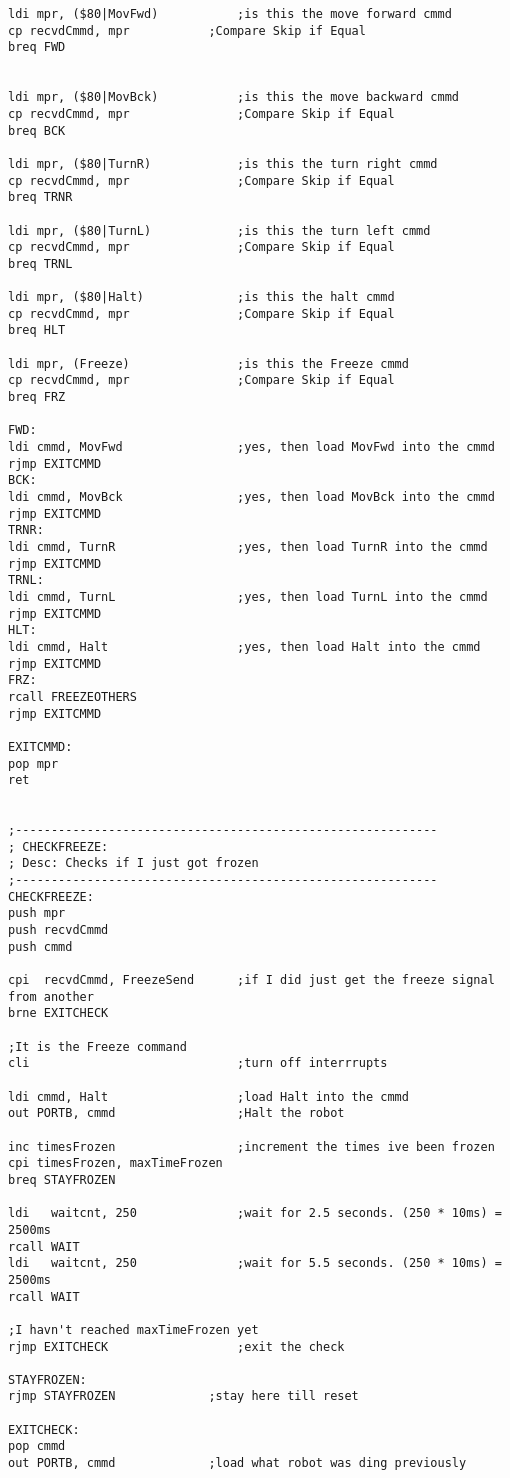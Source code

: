 \documentclass[12pt,letterpaper]{article}
\begin{document}
\begin{verbatim}
ldi mpr, ($80|MovFwd)			;is this the move forward cmmd
cp recvdCmmd, mpr 			;Compare Skip if Equal
breq FWD


ldi mpr, ($80|MovBck)			;is this the move backward cmmd
cp recvdCmmd, mpr				;Compare Skip if Equal
breq BCK

ldi mpr, ($80|TurnR)			;is this the turn right cmmd
cp recvdCmmd, mpr				;Compare Skip if Equal
breq TRNR

ldi mpr, ($80|TurnL)			;is this the turn left cmmd
cp recvdCmmd, mpr				;Compare Skip if Equal
breq TRNL

ldi mpr, ($80|Halt)				;is this the halt cmmd
cp recvdCmmd, mpr				;Compare Skip if Equal
breq HLT

ldi mpr, (Freeze)				;is this the Freeze cmmd
cp recvdCmmd, mpr				;Compare Skip if Equal
breq FRZ

FWD:
ldi cmmd, MovFwd				;yes, then load MovFwd into the cmmd
rjmp EXITCMMD
BCK:
ldi cmmd, MovBck				;yes, then load MovBck into the cmmd
rjmp EXITCMMD
TRNR:
ldi cmmd, TurnR					;yes, then load TurnR into the cmmd
rjmp EXITCMMD
TRNL:
ldi cmmd, TurnL					;yes, then load TurnL into the cmmd
rjmp EXITCMMD
HLT:
ldi cmmd, Halt					;yes, then load Halt into the cmmd
rjmp EXITCMMD
FRZ:
rcall FREEZEOTHERS
rjmp EXITCMMD

EXITCMMD:
pop mpr
ret


;-----------------------------------------------------------
; CHECKFREEZE: 
; Desc: Checks if I just got frozen
;-----------------------------------------------------------
CHECKFREEZE:
push mpr
push recvdCmmd
push cmmd 

cpi  recvdCmmd, FreezeSend		;if I did just get the freeze signal from another
brne EXITCHECK

;It is the Freeze command
cli  							;turn off interrrupts

ldi cmmd, Halt					;load Halt into the cmmd
out PORTB, cmmd					;Halt the robot

inc timesFrozen					;increment the times ive been frozen
cpi timesFrozen, maxTimeFrozen	
breq STAYFROZEN

ldi	  waitcnt, 250				;wait for 2.5 seconds. (250 * 10ms) = 2500ms
rcall WAIT
ldi	  waitcnt, 250				;wait for 5.5 seconds. (250 * 10ms) = 2500ms
rcall WAIT

;I havn't reached maxTimeFrozen yet
rjmp EXITCHECK					;exit the check

STAYFROZEN:
rjmp STAYFROZEN				;stay here till reset

EXITCHECK:
pop cmmd
out PORTB, cmmd				;load what robot was ding previously


\end{verbatim}
\end{document}
